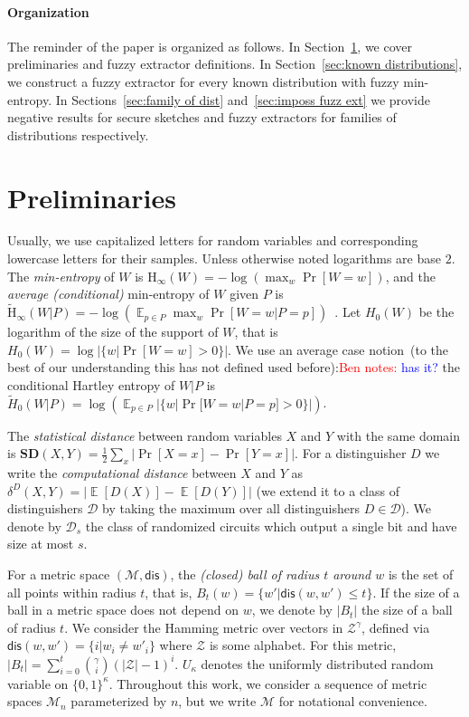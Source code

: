 \documentclass[11pt]{article}
\newcommand{\secref}[1]{\mbox{Section~\ref{#1}}}
\DeclareMathOperator*{\expe}{\mathbb{E}}
\newcommand{\dis}{\ensuremath{\mathsf{dis}}}
\newcommand{\Hoo}{\mathrm{H}_\infty}
\newcommand{\Hav}{\tilde{\mathrm{H}}_\infty}
\newcommand{\sd}{\ensuremath{\mathbf{SD}}}
\newcommand{\authnote}[2]{{\textcolor{red}{\textsf{#1 notes: }\textcolor{blue}{ #2}}\marginpar{\textcolor{red}{\textbf{!!!!!}}}}}
\newcommand{\authnote}[2]{}
\newcommand{\bnote}[1]{{\authnote{Ben}{#1}}}
\begin{document}
\paragraph{Organization} The reminder of the paper is organized as follows.  In \secref{sec:preliminaries}, we cover preliminaries and fuzzy extractor definitions.  In \secref{sec:known distributions}, we construct a fuzzy extractor for every known distribution with fuzzy min-entropy.  In Sections~\ref{sec:family of dist} and~\ref{sec:imposs fuzz ext} we provide negative results for secure sketches and fuzzy extractors for families of distributions respectively.


\section{Preliminaries}
\label{sec:preliminaries}
Usually, we use capitalized letters for random variables and corresponding lowercase letters for their samples.
 Unless otherwise noted logarithms are base $2$.
The {\em min-entropy} of $W$ is $\Hoo(W) = -\log(\max_w \Pr[W=w])$,
and the {\em average (conditional)} min-entropy of $W$ given $P$ is  $\Hav(W|P) = -\log(\expe_{p\in P} \max_{w} \Pr[W=w|P=p])$~\cite[Section 2.4]{DBLP:journals/siamcomp/DodisORS08}.   Let $H_0(W)$ be the logarithm of the size of the support of $W$,  that is $H_0(W) = \log |\{w | \Pr[W=w]>0\}|$.  We use an average case notion~(to the best of our understanding this has not defined used before):\bnote{has it?}
the conditional Hartley entropy of $W |P $ is $\tilde{H}_0(W |P) = \log ( \expe_{p\in P} |\{w | \Pr[W=w |P=p]>0\}|)$.

The {\em statistical distance} between random variables $X$ and $Y$ with the same domain is $\sd(X,Y) = \frac12 \sum_x |\Pr[X=x] - \Pr[Y=x]|$.
For a distinguisher $D$ we write the \emph{computational distance} between $X$ and $Y$ as $\delta^D(X,Y) = \left| \expe[D(X)]-\expe[D(Y)]\right |$ (we extend it to a class of distinguishers $\mathcal{D}$ by taking the maximum over all distinguishers $D\in\mathcal{D}$).  We denote by $\mathcal{D}_{s}$ the class of randomized circuits which output a single bit and have size at most $s$.

For a metric space $(\mathcal{M}, \dis)$, the \emph{(closed) ball of radius $t$ around $w$} is the set of all points within radius $t$, that is, $B_t(w) = \{w'| \dis(w, w')\leq t\}$.  If the size of a ball in a metric space does not depend on $w$, we denote by $|B_t|$ the size of a ball of radius $t$.  We consider the Hamming metric over vectors in $\mathcal{Z}^\gamma$, defined via $\dis(w,w') = \{i | w_i \neq w'_i\}$ where $\mathcal{Z}$ is some alphabet.  For this metric, $|B_t| = \sum_{i=0}^t {\gamma \choose i} (|\mathcal{Z}|-1)^i $.  $U_\kappa$ denotes the uniformly  distributed random variable on $\{0,1\}^\kappa$.  Throughout this work, we consider a sequence of metric spaces $\mathcal{M}_n$ parameterized by $n$, but we write $\mathcal{M}$ for notational convenience.
\end{document}
